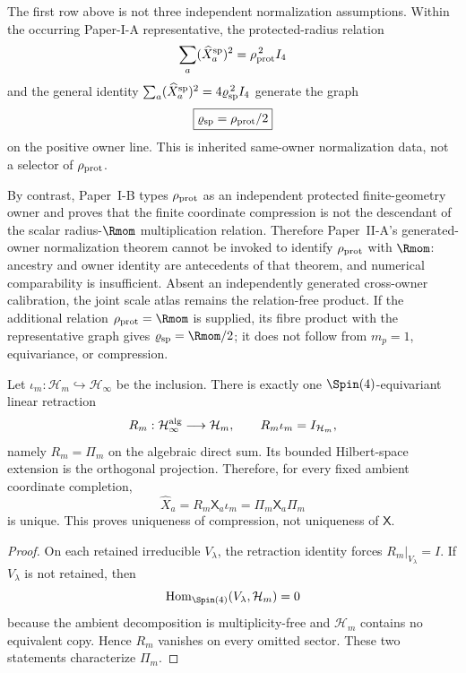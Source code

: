 \documentclass[12pt,a4paper]{article}
\begin{document}
\begin{remark}
\label{p2c:rem:protected-scale-owner-firewall}
The first row above is not three independent normalization assumptions.
Within the occurring Paper-I-A representative, the protected-radius relation
\[
 \sum_a(\widehat X_a^{\rm sp})^2
 =\rho_{\rm prot}^{\,2}I_4
\]
and the general identity
\(\sum_a(\widehat X_a^{\rm sp})^2
=4\varrho_{\rm sp}^{\,2}I_4\) generate the graph
\[
 \boxed{\varrho_{\rm sp}=\rho_{\rm prot}/2}
\]
on the positive owner line.  This is inherited same-owner normalization data,
not a selector of \(\rho_{\rm prot}\).

By contrast, Paper~I-B types \(\rho_{\rm prot}\) as an independent protected
finite-geometry owner and proves that the finite coordinate compression is not
the descendant of the scalar radius-\(\Rmom\) multiplication relation.
Therefore Paper~II-A's generated-owner normalization theorem cannot be invoked
to identify \(\rho_{\rm prot}\) with \(\Rmom\): ancestry and owner identity are
antecedents of that theorem, and numerical comparability is insufficient.
Absent an independently generated cross-owner calibration, the joint scale
atlas remains the relation-free product.  If the additional relation
\(\rho_{\rm prot}=\Rmom\) is supplied, its fibre product with the representative
graph gives \(\varrho_{\rm sp}=\Rmom/2\); it does not follow from
\(m_p=1\), equivariance, or compression.
\end{remark}

\begin{theorem}
\label{p2:thm:finite-toeplitz-coordinate-uniqueness}
Let \(\iota_m:\mathcal H_m\hookrightarrow\mathcal H_\infty\) be the inclusion.
There is exactly one \(\Spin(4)\)-equivariant linear retraction
\[
R_m:\mathcal H_\infty^{\rm alg}\longrightarrow\mathcal H_m,
\qquad
R_m\iota_m=I_{\mathcal H_m},
\]
namely \(R_m=\Pi_m\) on the algebraic direct sum.  Its bounded Hilbert-space
extension is the orthogonal projection.  Therefore, for every fixed ambient
coordinate completion,
\[
\widehat X_a=R_m\mathsf X_a\iota_m
=\Pi_m\mathsf X_a\Pi_m
\]
is unique.  This proves uniqueness of compression, not uniqueness of
\(\mathsf X\).
\end{theorem}

\begin{proof}
On each retained irreducible \(V_\lambda\), the retraction identity forces
\(R_m|_{V_\lambda}=I\).  If \(V_\lambda\) is not retained, then
\[
\operatorname{Hom}_{\Spin(4)}(V_\lambda,\mathcal H_m)=0
\]
because the ambient decomposition is multiplicity-free and
\(\mathcal H_m\) contains no equivalent copy.  Hence \(R_m\) vanishes on every
omitted sector.  These two statements characterize \(\Pi_m\).
\end{proof}
\end{document}
